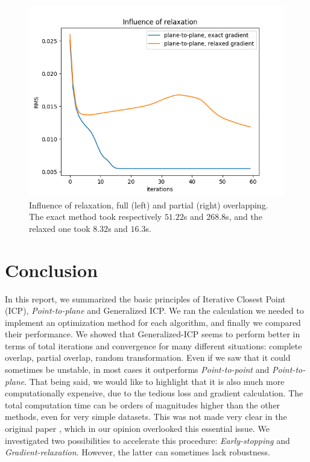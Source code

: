 \documentclass[11pt,letterpaper,leqno]{article}
\begin{document}
\begin{itemize}
\begin{figure}[ht!]
\begin{minipage}{0.5\linewidth}
        \end{minipage}\hfill
        \begin{minipage}{0.5\linewidth}
        \includegraphics[width=\linewidth]{img/comparison_relaxed.png}
        \end{minipage}
        \caption{Influence of relaxation, full (left) and partial (right) overlapping. The exact method took respectively $51.22$s and $268.8$s, and the relaxed one took $8.32$s and $16.3$s.}
        \label{fig:relaxation}
    \end{figure}
\end{itemize}

\section{Conclusion}

In this report, we summarized the basic principles of Iterative Closest Point (ICP), \textit{Point-to-plane} and Generalized ICP. We ran the calculation we needed to implement an optimization method for each algorithm, and finally we compared their performance. We showed that Generalized-ICP seems to perform better in terms of total iterations and convergence for many different situations: complete overlap, partial overlap, random transformation. Even if we saw that it could sometimes be unstable, in most cases it outperforms \textit{Point-to-point} and \textit{Point-to-plane}. That being said, we would like to highlight that it is also much more computationally expensive, due to the tedious loss and gradient calculation. The total computation time can be orders of magnitudes higher than the other methods, even for very simple datasets. This was not made very clear in the original paper \cite{generalized-icp}, which in our opinion overlooked this essential issue. We investigated two possibilities to accelerate this procedure: \textit{Early-stopping} and \textit{Gradient-relaxation}. However, the latter can sometimes lack robustness. 
\end{document}
